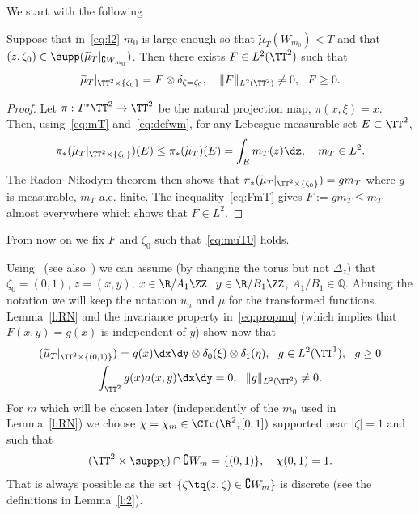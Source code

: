 We start with the following

\begin{lemm}\label{l:RN}
Suppose that in~\eqref{eq:l2} $ m_0 $ is large enough so that $ \widetilde \mu_T (W_{m_0}) < T $ and that $ (z, \zeta_0) \in \supp (\widetilde \mu_T |_{ \complement W_{m_0} }) $. Then there exists $ F \in L^2 (\TT^2) $ such that
\begin{equation}\label{eq:muT0}
\widetilde \mu_T |_{ \TT^2 \times \{ \zeta_0 \} } = F \otimes \delta_{ \zeta = \zeta_0 }, \ \ \ \| F \|_{ L^2 (\TT^2) } \neq 0, \ \ F \geq 0.
\end{equation}
\end{lemm}

\begin{proof}
Let $ \pi : T^*\TT^2 \to \TT^2 $ be the natural projection map, $ \pi (x, \xi) = x $. Then, using~\eqref{eq:mT} and~\eqref{eq:defwm}, for any Lebesgue measurable set $ E \subset \TT^2 $,
\begin{equation}\label{eq:FmT}
\pi_* (\widetilde \mu_T |_{ \TT^2 \times \{ \zeta_0 \}}) (E)
\leq \pi_* (\widetilde \mu_T) (E) = \int_E m_T (z) \dz, \ \ \ m_T \in L^2.
\end{equation}
The Radon--Nikodym theorem then shows that $ \pi_* (\widetilde \mu_T |_{ \TT^2 \times \{ \zeta_0 \}}) = g m_T $ where $ g $ is measurable, $m_T$-a.e. finite. The inequality~\eqref{eq:FmT} gives $ F := g m_T \leq m_T $ almost everywhere which shows that $ F \in L^2 $.
\end{proof}

From now on we fix $ F $ and $ \zeta_0 $ such that~\eqref{eq:muT0} holds.

Using~\cite[Lemma~2.7]{BZ4} (see also~\cite[Figure~1]{BZ4}) we can assume (by changing the torus but not $ \Delta_z $) that $ \zeta_0 = (0, 1) $, $ z = (x, y) $, $ x \in \R/A_1 \ZZ $, $ y \in \R /B_1 \ZZ $, $ A_1/B_1 \in
\mathbb Q $. Abusing the notation we will keep the notation $ u_n $ and $
\mu $ for the transformed functions. Lemma~\ref{l:RN} and the invariance property in~\eqref{eq:propmu} (which implies that $ F (x, y) = g (x) $ is independent of $ y $) show now that
\begin{equation}\label{eq:muT00}
\begin{gathered}
(\widetilde \mu_T |_{ \TT^2 \times \{ (0,1) \} }) = g (x) \dx\dy \otimes \delta_{0} (\xi) \otimes\delta_1 (\eta), \ \ g \in L^2 (\TT^1), \ \ g \geq 0 \\
\int_{ \TT^2 } g (x) a (x, y) \dx \dy = 0, \ \
\| g \|_{ L^2 (\TT^2)} \neq 0.
\end{gathered}
\end{equation}
For $ m $ which will be chosen later (independently of the $ m_0 $ used in Lemma~\ref{l:RN}) we choose $ \chi = \chi_m \in \CIc (\R^2; [0,1])$ supported near $ | \zeta |= 1 $ and such that
\begin{equation}\label{eq:suppchi}
(\TT^2 \times \supp \chi) \cap \complement W_m = \{ (0, 1) \}, \ \ \ \chi(0,1) = 1.
\end{equation}
That is always possible as the set $ \{\zeta \tq (z, \zeta) \in \complement W_m \} $ is discrete (see the definitions in Lemma~\ref{l:2}).

